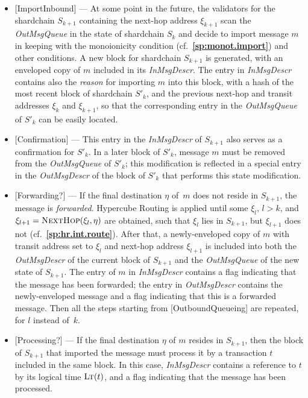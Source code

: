 \documentclass[12pt,oneside]{article}
\def\refpoint#1{{\rm\textbf{\ref{#1}}}}
\let\ptref=\refpoint
\def\opsc#1{\operatorname{\textsc{#1}}}
\def\LT{\opsc{Lt}}
\def\NextHop{\opsc{NextHop}}
\begin{document}
\begin{itemize}
\item{[ImportInbound]} --- At some point in the future, the validators for the shardchain $S_{k+1}$ containing the next-hop address $\xi_{k+1}$ scan the {\em OutMsgQueue\/} in the state of shardchain $S_k$ and decide to import message $m$ in keeping with the monoionicity condition (cf.~\ptref{sp:monot.import}) and other conditions. A new block for shardchain $S_{k+1}$ is generated, with an enveloped copy of $m$ included in its {\em InMsgDescr}. The entry in {\em InMsgDescr\/} contains also the {\em reason\/} for importing $m$ into this block, with a hash of the most recent block of shardchain $S'_k$, and the previous next-hop and transit addresses $\xi_k$ and $\xi_{k+1}$, so that the corresponding entry in the {\em OutMsgQueue\/} of $S'_k$ can be easily located.
\item{[Confirmation]} --- This entry in the {\em InMsgDescr\/} of $S_{k+1}$ also serves as a confirmation for $S'_k$. In a later block of $S'_k$, message $m$ must be removed from the {\em OutMsgQueue\/} of $S'_k$; this modification is reflected in a special entry in the {\em OutMsgDescr\/} of the block of $S'_k$ that performs this state modification.
\item{[Forwarding?]} --- If the final destination $\eta$ of~$m$ does not reside in $S_{k+1}$, the message is {\em forwarded}. Hypercube Routing is applied until some $\xi_l$, $l>k$, and $\xi_{l+1}=\NextHop(\xi_l,\eta)$ are obtained, such that $\xi_l$ lies in $S_{k+1}$, but $\xi_{l+1}$ does not (cf.~\ptref{sp:hr.int.route}). After that, a newly-enveloped copy of $m$ with transit address set to $\xi_l$ and next-hop address $\xi_{l+1}$ is included into both the {\em OutMsgDescr\/} of the current block of $S_{k+1}$ and the {\em OutMsgQueue\/} of the new state of $S_{k+1}$. The entry of $m$ in {\em InMsgDescr\/} contains a flag indicating that the message has been forwarded; the entry in {\em OutMsgDescr\/} contains the newly-enveloped message and a flag indicating that this is a forwarded message. Then all the steps starting from [OutboundQueueing] are repeated, for $l$ instead of~$k$.
\item{[Processing?]} --- If the final destination $\eta$ of $m$ resides in $S_{k+1}$, then the block of $S_{k+1}$ that imported the message must process it by a transaction $t$ included in the same block. In this case, {\em InMsgDescr\/} contains a reference to $t$ by its logical time $\LT(t)$, and a flag indicating that the message has been processed.
\end{itemize}
\end{document}
